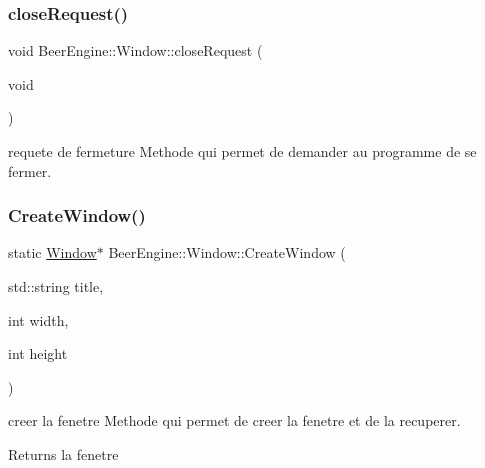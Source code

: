 \mbox{\label{class_beer_engine_1_1_window_a0ff67069f460adb018b1050da62d8a54}} 
\subsubsection{\texorpdfstring{close\+Request()}{closeRequest()}}
{\footnotesize\ttfamily void Beer\+Engine\+::\+Window\+::close\+Request (\begin{DoxyParamCaption}\item[{void}]{ }\end{DoxyParamCaption})}



requete de fermeture Methode qui permet de demander au programme de se fermer. 

\mbox{\label{class_beer_engine_1_1_window_a630b8f5eca39a184818b876b1eb0374d}} 
\subsubsection{\texorpdfstring{Create\+Window()}{CreateWindow()}}
{\footnotesize\ttfamily static \mbox{\hyperlink{class_beer_engine_1_1_window}{Window}}$\ast$ Beer\+Engine\+::\+Window\+::\+Create\+Window (\begin{DoxyParamCaption}\item[{std\+::string}]{title,  }\item[{int}]{width,  }\item[{int}]{height }\end{DoxyParamCaption})\hspace{0.3cm}{\ttfamily [static]}}



creer la fenetre Methode qui permet de creer la fenetre et de la recuperer. 

\begin{DoxyReturn}{Returns}
la fenetre 
\end{DoxyReturn}
\mbox{\label{class_beer_engine_1_1_window_a9a73331ffd93866e83e766540e3891fb}} 
